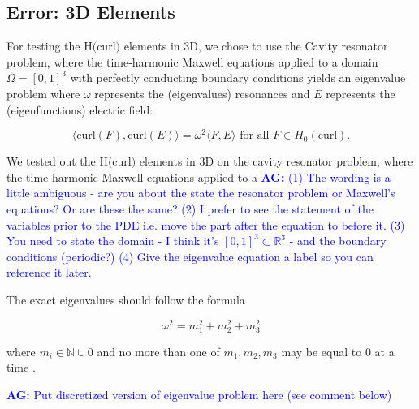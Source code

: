\documentclass[manuscript,screen]{acmart}
\newcommand{\R}{\mathbb{R}}
\newcommand{\akg}[1]{\textcolor{blue}{\textbf{AG:} #1}}
\begin{document}
\newpage
\subsection{Error: 3D Elements}
For testing the H$($curl$)$ elements in 3D, we chose to use the Cavity resonator problem, where the time-harmonic Maxwell equations applied to a domain $\Omega = [0,1]^3$ with perfectly conducting boundary conditions yields an eigenvalue problem where $\omega$ represents the (eigenvalues) resonances and $E$ represents the (eigenfunctions) electric field:

\begin{equation}
    \langle \text{curl}(F), \text{curl}(E) \rangle = \omega^2 \langle F, E \rangle \text{ for all } F \in H_0(\text{curl}).
\end{equation}

We tested out the H$($curl$)$ elements in 3D on the cavity resonator problem, where the time-harmonic Maxwell equations applied to a 
\akg{(1) The wording is a little ambiguous - are you about the state the resonator problem or Maxwell's equations?  Or are these the same?  (2) I prefer to see the statement of the variables prior to the PDE i.e. move the part after the equation to before it. (3) You need to state the domain - I think it's $[0,1]^3\subset\R^3$ - and the boundary conditions (periodic?) (4) Give the eigenvalue equation a label so you can reference it later.}

\noindent The exact eigenvalues should follow the formula

\[ \omega^2 = m_1^2 + m_2^2 + m_3^2 \]

\noindent where $m_i \in \mathbb{N} \cup {0}$ and no more than one of $m_1, m_2, m_3$ may be equal to $0$ at a time \cite{rognes2010efficient}.

\akg{Put discretized version of eigenvalue problem here (see comment below)}
\end{document}
